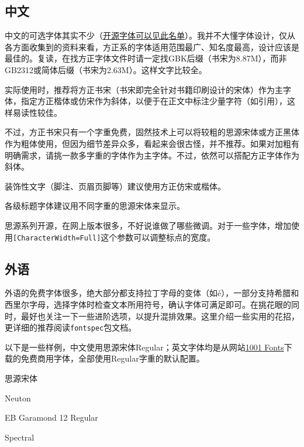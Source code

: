 \documentclass[10pt,openany]{book}
\begin{document}
\subsection{中文}

中文的可选字体其实不少（\href{https://drxie.github.io/OSFCC/}{开源字体可以见此名单}）。我并不大懂字体设计，仅从各方面收集到的资料来看，方正系的字体适用范围最广、知名度最高，设计应该是最佳的。复读，在找方正字体文件时请一定找GBK后缀（书宋为8.87M），而非GB2312或简体后缀（书宋为2.63M）。这样文字比较全。

实际使用时，推荐将方正书宋（书宋即完全针对书籍印刷设计的宋体）作为主字体，指定方正楷体或仿宋作为斜体，以便于在正文中标注少量字符（如引用），这样易读性较佳。

不过，方正书宋只有一个字重免费，固然技术上可以将较粗的思源宋体或方正黑体作为粗体使用，但因为细节差异众多，看起来会很古怪，并不推荐。如果对加粗有明确需求，请挑一款多字重的字体作为主字体。不过，依然可以搭配方正字体作为斜体。

装饰性文字（脚注、页眉页脚等）建议使用方正仿宋或楷体。

各级标题字体建议用不同字重的思源宋体来显示。

思源系列开源，在网上版本很多，不好说谁做了哪些微调。对于一些字体，增加使用\texttt{[CharacterWidth=Full]}这个参数可以调整标点的宽度。

\subsection{外语}

外语的免费字体很多，绝大部分都支持拉丁字母的变体（如é），一部分支持希腊和西里尔字母，选择字体时检查文本所用符号，确认字体可满足即可。在挑花眼的同时，最好也关注一下一些进阶选项，以提升混排效果。这里介绍一些实用的花招，更详细的推荐阅读\texttt{fontspec}包文档。

以下是一些样例，中文使用思源宋体Regular；英文字体均是从网站\href{https://www.1001fonts.com}{1001 Fonts}下载的免费商用字体，全部使用Regular字重的默认配置。

\begin{adjustwidth}{2em}{2em}
    \blankpar

    \songtien 思源宋体\testtext

    Neuton\testtext

    EB Garamond 12 Regular\testtext

    Spectral\testtext

    \blankpar
\end{adjustwidth}
\end{document}
